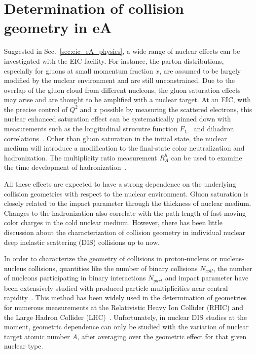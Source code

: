 \chapter{Determination of collision geometry in eA} \label{chp:geometry}

Suggested in Sec.~\ref{sec:eic_eA_physics}, a wide range of nuclear effects can be
investigated with the EIC facility. For instance, the parton distributions,
especially for gluons at small momentum fraction $x$, are assumed to be largely modified by
the nuclear environment and are still unconstrained. Due to the overlap
of the gluon cloud from different nucleons, the gluon saturation effects may arise
and are thought to be amplified with a nuclear target. At an EIC, with the precise control
of $Q^{2}$ and $x$ possible by measuring the scattered electrons, this nuclear enhanced
saturation effect can be systematically pinned down with measurements such as the
longitudinal strucutre function $F_{L}$~\cite{Albacete:2009fh} and dihadron
correlations~\cite{Dominguez:2011wm}. Other than gluon saturation in the initial
state, the nuclear medium will introduce a modification to the final-state color
neutralization and hadronization. The multiplicity ratio measurement $R^{h}_{A}$
can be used to examine the time development of hadronization~\cite{Accardi:2007in}.
 
All these effects are expected to have a strong dependence on the underlying
collision geometries with respect to the nuclear environment. Gluon saturation
is closely related to the impact parameter through the thickness of nuclear
medium. Changes to the hadronization also correlate with the path length of
fast-moving color charges in the cold nuclear medium. However, there has been
little discussion about the characterization of collision geometry in individual
nuclear deep inelastic scattering (DIS) collisions up to now.

In order to characterize the geometry of collisions in proton-nucleus or nucleus-nucleus collisions, quantities
like the number of binary collisions $N_{coll}$, the number of nucleons participating in
binary interactions $N_{part}$ and impact parameter have been extensively
studied with produced particle multiplicities near central rapidity~\cite{Broniowski:2001ei}. This method has been widely used in
the determination of geometries for numerous measurements at the Relativistic Heavy Ion Collider (RHIC) and
the Large Hadron Collider (LHC)~\cite{Aamodt:2010cz,Abelev:2008ab,Back:2002uc}. Unfortunately, in
nuclear DIS studies at the moment, geometric dependence
can only be studied with the variation of nuclear target atomic number $A$,
after averaging over the geometric effect for that given nuclear type.  


